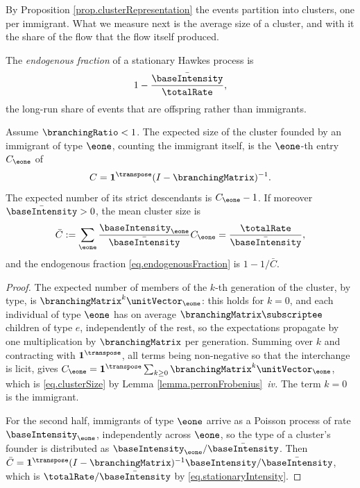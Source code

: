 By Proposition \ref{prop.clusterRepresentation} the events partition into clusters,
one per immigrant.
What we measure next is the average size of a cluster,
and with it the share of the flow that the flow itself produced.

\begin{defi}\label{def.endogenousFraction}
 The \emph{endogenous fraction} of a stationary Hawkes process is
 \begin{equation}\label{eq.endogenousFraction}
  1 - \frac{\bar{\baseIntensity}}{\totalRate},
 \end{equation}
 the long-run share of events that are offspring rather than immigrants.
\end{defi}

\begin{prop}\label{prop.clusterSize}
 Assume $\branchingRatio < 1$.
 The expected size of the cluster founded by an immigrant of type $\eone$,
 counting the immigrant itself, is the $\eone$-th entry $C_{\eone}$ of
 \begin{equation}\label{eq.clusterSize}
  C = \mathbf{1}^{\transpose} (I - \branchingMatrix)^{-1} .
 \end{equation}
 The expected number of its strict descendants is $C_{\eone} - 1$.
 If moreover $\bar{\baseIntensity} > 0$, the mean cluster size is
 \begin{equation}\label{eq.meanClusterSize}
  \bar{C} := \sum_{\eone} \frac{\baseIntensity_{\eone}}{\bar{\baseIntensity}} C_{\eone}
  = \frac{\totalRate}{\bar{\baseIntensity}} ,
 \end{equation}
 and the endogenous fraction \eqref{eq.endogenousFraction} is $1 - 1/\bar C$.
\end{prop}
\begin{proof}
 The expected number of members of the $k$-th generation of the cluster, by type,
 is $\branchingMatrix^{k}\unitVector_{\eone}$: this holds for $k=0$, and each individual of
 type $\eone$ has on average $\branchingMatrix\subscriptee$ children of type $e$,
 independently of the rest, so the expectations propagate by one multiplication by
 $\branchingMatrix$ per generation.
 Summing over $k$ and contracting with $\mathbf{1}^{\transpose}$,
 all terms being non-negative so that the interchange is licit,
 gives $C_{\eone} = \mathbf{1}^{\transpose}\sum_{k\geq0}\branchingMatrix^{k}
 \unitVector_{\eone}$, which is \eqref{eq.clusterSize} by
 Lemma \ref{lemma.perronFrobenius}~\emph{iv.}
 The term $k=0$ is the immigrant.

 For the second half, immigrants of type $\eone$ arrive as a Poisson process of rate
 $\baseIntensity_{\eone}$, independently across $\eone$,
 so the type of a cluster's founder is distributed as
 $\baseIntensity_{\eone}/\bar{\baseIntensity}$.
 Then $\bar C = \mathbf{1}^{\transpose}(I-\branchingMatrix)^{-1}\baseIntensity /
 \bar{\baseIntensity}$, which is $\totalRate/\bar{\baseIntensity}$ by
 \eqref{eq.stationaryIntensity}.
\end{proof}

